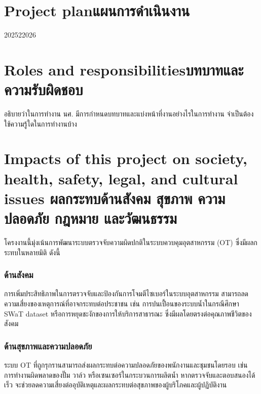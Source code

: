 \section{\ifenglish Project plan\else แผนการดำเนินงาน\fi}

\begin{plan}{6}{2025}{2}{2026}
\end{plan}

\section{\ifenglish Roles and responsibilities\else บทบาทและความรับผิดชอบ\fi}
อธิบายว่าในการทำงาน นศ. มีการกำหนดบทบาทและแบ่งหน้าที่งานอย่างไรในการทำงาน จำเป็นต้องใช้ความรู้ใดในการทำงานบ้าง

\section{\ifenglish%
Impacts of this project on society, health, safety, legal, and cultural issues
\else%
ผลกระทบด้านสังคม สุขภาพ ความปลอดภัย กฎหมาย และวัฒนธรรม
\fi}

\hspace{2em} โครงงานนี้มุ่งเน้นการพัฒนาระบบตรวจจับความผิดปกติในระบบควบคุมอุตสาหกรรม (OT) ซึ่งมีผลกระทบในหลายมิติ ดังนี้

\subsubsection{ด้านสังคม}
    \hspace{2em} การเพิ่มประสิทธิภาพในการตรวจจับและป้องกันการโจมตีไซเบอร์ในระบบอุตสาหกรรม สามารถลด \\ ความเสี่ยงของเหตุการณ์ที่อาจกระทบต่อประชาชน เช่น การปนเปื้อนของระบบน้ำในกรณีศึกษา \\ SWaT dataset หรือการหยุดชะงักของการให้บริการสาธารณะ ซึ่งมีผลโดยตรงต่อคุณภาพชีวิตของสังคม

\subsubsection{ด้านสุขภาพและความปลอดภัย}
    \hspace{2em} ระบบ OT ที่ถูกรุกรานสามารถส่งผลกระทบต่อความปลอดภัยของพนักงานและชุมชนโดยรอบ เช่น การทำงานผิดพลาดของปั๊ม วาล์ว หรือเซนเซอร์ในกระบวนการผลิตน้ำ หากตรวจจับและตอบสนองได้เร็ว จะช่วยลดความเสี่ยงต่ออุบัติเหตุและผลกระทบต่อสุขภาพของผู้บริโภคและผู้ปฏิบัติงาน

